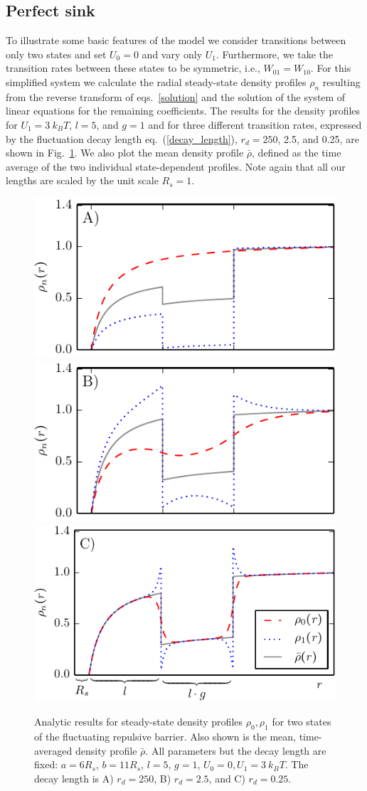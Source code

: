 \documentclass[preprint,superscriptaddress]{revtex4-1}
\begin{document}
\subsection{Perfect sink}

To illustrate some basic features of the model we consider transitions between only two states and set $U_0=0$ and vary only $U_1$. Furthermore, we take the transition rates between these states to be symmetric, i.e., $W_{01}=W_{10}$.
For this simplified system we calculate the radial steady-state density profiles $\rho_n$ resulting from the reverse transform of eqs.~\eqref{solution} and the solution of the system of linear equations for the remaining coefficients. The results for the density profiles for $U_1=3~k_BT$, $l=5$, and $g=1$ and for three different transition rates, expressed by the fluctuation decay length eq.~(\ref{decay_length}),  $r_d = 250$, 2.5, and 0.25, are shown in Fig.~\ref{fig1}. We also plot the mean density profile $\bar{\rho}$, defined as the time average of the two individual state-dependent profiles. Note again that all our lengths are scaled by the unit scale $R_s=1$. 
\begin{figure}
\begin{center}
\includegraphics[width= .4 \textwidth]{plots/d1.pdf}
\includegraphics[width= .4 \textwidth]{plots/d2.pdf}
\includegraphics[width= .4 \textwidth]{plots/d3.pdf}
\caption{Analytic results for steady-state density profiles $\rho_0, \rho_1$ for two states of the fluctuating repulsive barrier. Also shown is the mean, time-averaged density profile $\bar{\rho}$. All parameters but the decay length are fixed: $a = 6 R_s$, $b = 11 R_s$, $l=5$, $g=1$, $ U_0 = 0, U_1 = 3 ~k_BT$. The decay length is A) $r_d = 250$, B) $r_d=2.5$, and C) $r_d=0.25$.}
\label{fig1}
\end{center}
\end{figure}
\end{document}
